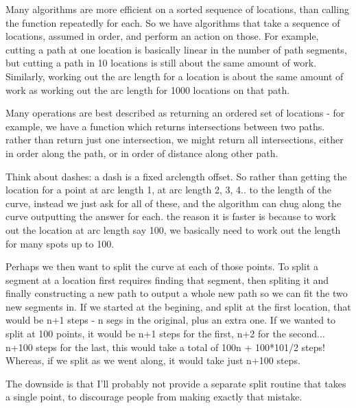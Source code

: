 Many algorithms are more efficient on a sorted sequence of locations,
than calling the function repeatedly for each.  So we have algorithms
that take a sequence of locations, assumed in order, and perform an
action on those.  For example, cutting a path at one location is
basically linear in the number of path segments, but cutting a path in
10 locations is still about the same amount of work.  Similarly,
working out the arc length for a location is about the same amount of
work as working out the arc length for 1000 locations on that path.

Many operations are best described as returning an ordered set of
locations - for example, we have a function which returns
intersections between two paths.  rather than return just one
intersection, we might return all intersections, either in order along
the path, or in order of distance along other path.

Think about dashes: a dash is a fixed arclength offset.  So rather
than getting the location for a point at arc length 1, at arc length
2, 3, 4.. to the length of the curve, instead we just ask for all of
these, and the algorithm can chug along the curve outputting the
answer for each.  the reason it is faster is because to work out the
location at arc length say 100, we basically need to work out the
length for many spots up to 100.

Perhaps we then want to split the curve at each of those points.  To
split a segment at a location first requires finding that segment,
then spliting it and finally constructing a new path to output a whole
new path so we can fit the two new segments in.  If we started at the
begining, and split at the first location, that would be n+1 steps - n
segs in the original, plus an extra one.  If we wanted to split at 100
points, it would be n+1 steps for the first, n+2 for the
second... n+100 steps for the last, this would take a total of 100n +
100*101/2 steps!  Whereas, if we split as we went along, it would take
just n+100 steps.

The downside is that I'll probably not provide a separate split
routine that takes a single point, to discourage people from making
exactly that mistake.

